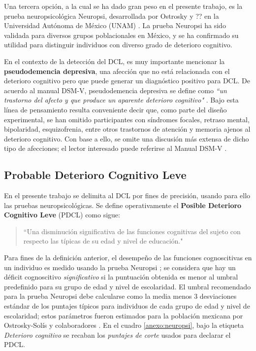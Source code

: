\documentclass[12pt,letterpaper,draft]{book}
\begin{document}

Una tercera opción, a la cual se ha dado gran peso en el presente trabajo, es la prueba neuropsicológica Neuropsi, desarrollada por Ostrosky y ?? en la Universidad Autónoma de México (UNAM) \cite{Ostrosky1999}.
%
La prueba Neuropsi ha sido validada para diversos grupos poblacionales en México, y se ha confirmado su utilidad para distinguir individuos con diverso grado de deterioro cognitivo.

En el contexto de la detección del DCL, es muy importante mencionar la \textbf{pseudodemencia depresiva}, una afección que no está relacionada con el deterioro cognitivo pero que puede generar un diagnóstico positivo para DCL.
%
De acuerdo al manual DSM-V, pseudodemencia depresiva se define como \textit{``un trastorno del afecto y que produce un aparente deterioro cognitivo"} \cite{DCM5}.
%
Bajo esta línea de pensamiento resulta conveniente decir que, como parte del diseño experimental, se han omitido participantes con síndromes focales, retraso mental, bipolaridad, esquizofrenia, entre otros trastornos de atención y memoria ajenos al deterioro cognitivo. 
%
Con base a ello, se omite una discusión más extensa de dicho tipo de afecciones; el lector interesado puede referirse al Manual DSM-V \cite{DCM5}.

\subsection{Probable Deterioro Cognitivo Leve}

En el presente trabajo se delimita al DCL por fines de precisión, usando para ello las pruebas neuropsicológicas. 
%
Se define operativamente el \textbf{Posible Deterioro Cognitivo Leve} (PDCL) como sigue:
\begin{quote}
``Una disminución significativa de las funciones cognitivas del sujeto con respecto las típicas de su edad y nivel de educación."
\end{quote}

Para fines de la definición anterior, el desempeño de las funciones cognoscitivas en un individuo es medido usando la prueba Neuropsi \cite{Ostrosky1999}; se considera que hay un déficit cognoscitivo \textit{significativo} si la puntuación obtenida es menor al umbral predefinido para su grupo de edad y nivel de escolaridad.
%
El umbral recomendado para la prueba Neuropsi debe calcularse como la media menos 3 desviaciones estándar de los puntajes típicos para individuos de cada grupo de edad y nivel de escolaridad; estos parámetros fueron estimados para la población mexicana por Ostrosky-Solís y colaboradores \cite{Ostrosky1999}.
%
En el cuadro \ref{anexo:neuropsi}, bajo la etiqueta \textit{Deterioro cognitivo} se recaban los \textit{puntajes de corte} usados para declarar el PDCL.
\end{document}
